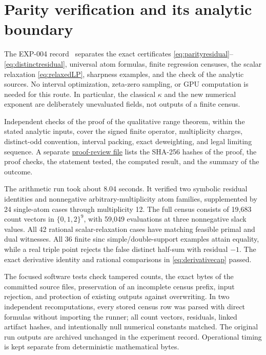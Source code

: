 \documentclass[11pt]{article}
\theoremstyle{remark}
\begin{document}
\section{Parity verification and its analytic boundary}

The EXP-004 record~\cite{RecordIV}
separates the exact certificates \eqref{eq:parityresidual}--%
\eqref{eq:distinctresidual}, universal atom formulas, finite regression
censuses, the scalar relaxation \eqref{eq:relaxedLP}, sharpness examples,
and the check of the analytic sources. No interval optimization, zeta-zero
sampling, or GPU computation is needed for this route. In particular,
the classical $\kappa$ and the new numerical exponent are deliberately
unevaluated fields, not outputs of a finite census.

Independent checks of the proof of the qualitative range theorem, within
the stated analytic inputs, cover the signed finite operator,
multiplicity charges, distinct-odd convention, interval packing, exact
deweighting, and legal limiting sequence. A separate
\href{https://github.com/fsantibanezleal/CAOS_RESEARCH/blob/main/problems/number-theory/riemann-hypothesis/experiments/EXP-004-parity-density-transfer/proof-review.json}{proof-review file}
lists the SHA-256 hashes of the proof, the proof checks, the statement
tested, the computed result, and the summary of the outcome.

The arithmetic run took about 8.04 seconds. It verified two symbolic
residual identities and
nonnegative arbitrary-multiplicity atom families, supplemented by 24
single-atom cases through multiplicity 12. The full census consists of
19,683 count vectors in $\{0,1,2\}^9$, with 59,049 evaluations at three
nonnegative slack values. All 42 rational scalar-relaxation cases have
matching feasible primal and dual witnesses. All 36 finite sinc
simple/double-support examples attain equality, while a real triple point
rejects the false distinct half-sum with residual $-1$. The exact derivative
identity and rational comparisons in \eqref{eq:derivativecap} passed.

The focused software tests check tampered counts, the exact bytes of the
committed source files, preservation of an incomplete census prefix, input
rejection, and protection of existing outputs against overwriting.
In two independent recomputations, every stored census row was parsed
with direct formulas without importing the runner; all count vectors,
residuals, linked artifact hashes, and intentionally null numerical
constants matched. The original run outputs are archived unchanged in the
experiment record. Operational timing is kept separate from deterministic
mathematical bytes.
\end{document}
